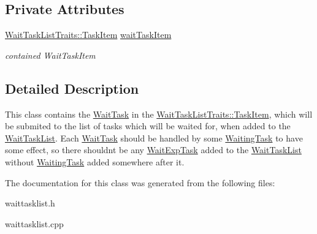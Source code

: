\subsection*{Private Attributes}
\begin{DoxyCompactItemize}
\item 
\hypertarget{class_wait_exp_task_a10b668341c30600b359980f4ebecb99f}{}\hyperlink{struct_wait_task_list_traits_1_1_task_item}{Wait\+Task\+List\+Traits\+::\+Task\+Item} \hyperlink{class_wait_exp_task_a10b668341c30600b359980f4ebecb99f}{wait\+Task\+Item}\label{class_wait_exp_task_a10b668341c30600b359980f4ebecb99f}

\begin{DoxyCompactList}\small\item\em contained Wait\+Task\+Item \end{DoxyCompactList}\end{DoxyCompactItemize}


\subsection{Detailed Description}
This class contains the \hyperlink{class_wait_task}{Wait\+Task} in the \hyperlink{struct_wait_task_list_traits_1_1_task_item}{Wait\+Task\+List\+Traits\+::\+Task\+Item}, which will be submited to the list of tasks which will be waited for, when added to the \hyperlink{class_wait_task_list}{Wait\+Task\+List}. Each \hyperlink{class_wait_task}{Wait\+Task} should be handled by some \hyperlink{class_waiting_task}{Waiting\+Task} to have some effect, so there shouldn\textquotesingle{}t be any \hyperlink{class_wait_exp_task}{Wait\+Exp\+Task} added to the \hyperlink{class_wait_task_list}{Wait\+Task\+List} without \hyperlink{class_waiting_task}{Waiting\+Task} added somewhere after it. 

The documentation for this class was generated from the following files\+:\begin{DoxyCompactItemize}
\item 
waittasklist.\+h\item 
waittasklist.\+cpp\end{DoxyCompactItemize}
